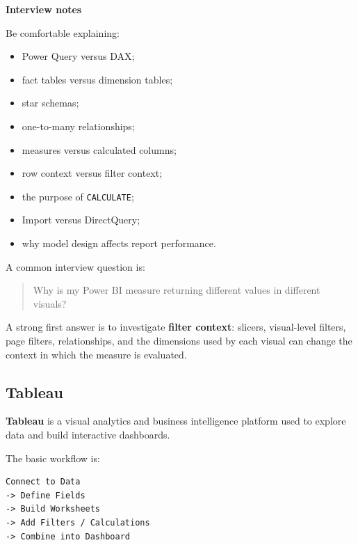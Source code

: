 \documentclass[11pt,letterpaper]{article}
\begin{document}

\textbf{Interview notes}

Be comfortable explaining:

\begin{itemize}[leftmargin=*]
    \item Power Query versus DAX;
    \item fact tables versus dimension tables;
    \item star schemas;
    \item one-to-many relationships;
    \item measures versus calculated columns;
    \item row context versus filter context;
    \item the purpose of \texttt{CALCULATE};
    \item Import versus DirectQuery;
    \item why model design affects report performance.
\end{itemize}

A common interview question is:

\begin{quote}
Why is my Power BI measure returning different values in different visuals?
\end{quote}

A strong first answer is to investigate \textbf{filter context}: slicers,
visual-level filters, page filters, relationships, and the dimensions used by
each visual can change the context in which the measure is evaluated.



\subsection{Tableau}

\textbf{Tableau} is a visual analytics and business intelligence platform used
to explore data and build interactive dashboards.

The basic workflow is:

\begin{lstlisting}
Connect to Data
-> Define Fields
-> Build Worksheets
-> Add Filters / Calculations
-> Combine into Dashboard
\end{lstlisting}
\end{document}
